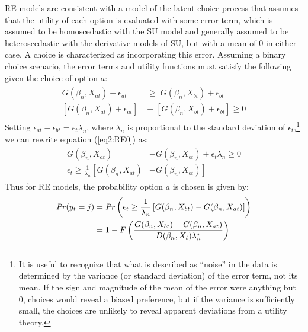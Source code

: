 \documentclass[../main.tex]{subfiles}
\begin{document}
RE models are consistent with a model of the latent choice process that assumes that the utility of each option is evaluated with some error term, which is assumed to be homoscedastic with the SU model and generally assumed to be heteroscedastic with the derivative models of SU, but with a mean of $0$ in either case.
A choice is characterized as incorporating this error.
Assuming a binary choice scenario, the error terms and utility functions must satisfy the following given the choice of option $a$:
\begin{align}
	\label{eq2:RE0}
	\begin{split}
		G(\beta_n,X_{at}) + \epsilon_{at} \;&\geq\; G(\beta_n,X_{bt}) + \epsilon_{bt}\\
		\left[G(\beta_n,X_{at}) + \epsilon_{at}\right] \;&-\; \left[G(\beta_n,X_{bt}) + \epsilon_{bt}\right] \geq 0
	\end{split}
\end{align}
\noindent Setting $\epsilon_{at} - \epsilon_{bt} = \epsilon_t\lambda_n$, where $\lambda_n$ is proportional to the standard deviation of $\epsilon_t$,\footnote{
	It is useful to recognize that what is described as \enquote{noise} in the data is determined by the variance (or standard deviation) of the error term, not its mean.
	If the sign and magnitude of the mean of the error were anything but 0, choices would reveal a biased preference, but if the variance is sufficiently small, the choices are unlikely to reveal apparent deviations from a utility theory.} we can rewrite equation (\ref{eq2:RE0}) as:
\begin{align}
	\label{eq2:RE1}
	\begin{split}
		G(\beta_n,X_{at}) &- G(\beta_n,X_{bt}) + \epsilon_t\lambda_n \geq 0\\
		\epsilon_t \geq \frac{1}{\lambda_n} \left[ G(\beta_n,X_{at}) \right.  &- \left. G(\beta_n,X_{bt}) \right]
	\end{split}
\end{align}
\noindent Thus for RE models, the probability option $a$ is chosen is given by:
\begin{align}
	\label{eq2:RE.2}
	\begin{split}
	{\ensuremath{\mathit{Pr}}}(y_t = j) &= {\mathit{Pr}}\left(  \epsilon_t \geq \frac{1}{\lambda_n} \left[ G(\beta_n,X_{bt}) - G(\beta_n,X_{at}) \right] \right)\\
	&= 1 - F\left( \dfrac{G(\beta_n,X_{bt}) - G(\beta_n,X_{at})}{D(\beta_n,X_t)\lambda_n^* }  \right)
	\end{split}
\end{align}
\end{document}
